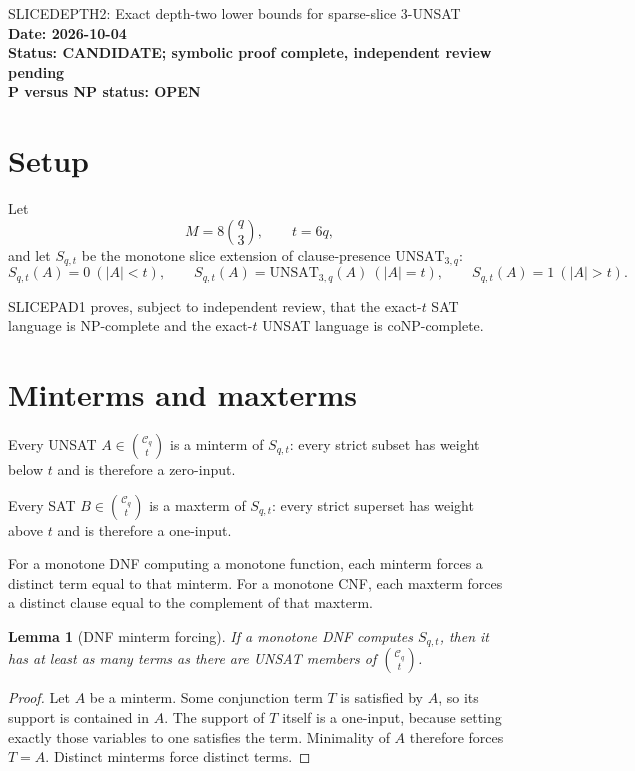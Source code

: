 \documentclass[11pt]{article}
\newtheorem{lemma}{Lemma}
\begin{document}
\begin{center}
{\Large SLICEDEPTH2: Exact depth-two lower bounds for sparse-slice 3-UNSAT}\\[4pt]
\textbf{Date: 2026-10-04}\\
\textbf{Status: CANDIDATE; symbolic proof complete, independent review pending}\\
\textbf{P versus NP status: OPEN}
\end{center}

\section{Setup}

Let
\[
M=8\binom q3,\qquad t=6q,
\]
and let \(S_{q,t}\) be the monotone slice extension of clause-presence
\(\mathrm{UNSAT}_{3,q}\):
\[
S_{q,t}(A)=0\ (|A|<t),\qquad
S_{q,t}(A)=\mathrm{UNSAT}_{3,q}(A)\ (|A|=t),\qquad
S_{q,t}(A)=1\ (|A|>t).
\]

SLICEPAD1 proves, subject to independent review, that the exact-\(t\) SAT
language is NP-complete and the exact-\(t\) UNSAT language is coNP-complete.

\section{Minterms and maxterms}

Every UNSAT \(A\in\binom{\mathcal C_q}{t}\) is a minterm of \(S_{q,t}\):
every strict subset has weight below \(t\) and is therefore a zero-input.

Every SAT \(B\in\binom{\mathcal C_q}{t}\) is a maxterm of \(S_{q,t}\):
every strict superset has weight above \(t\) and is therefore a one-input.

For a monotone DNF computing a monotone function, each minterm forces a
distinct term equal to that minterm.  For a monotone CNF, each maxterm forces
a distinct clause equal to the complement of that maxterm.

\begin{lemma}[DNF minterm forcing]
If a monotone DNF computes \(S_{q,t}\), then it has at least as many terms as
there are UNSAT members of \(\binom{\mathcal C_q}{t}\).
\end{lemma}

\begin{proof}
Let \(A\) be a minterm.  Some conjunction term \(T\) is satisfied by \(A\),
so its support is contained in \(A\).  The support of \(T\) itself is a
one-input, because setting exactly those variables to one satisfies the term.
Minimality of \(A\) therefore forces \(T=A\).  Distinct minterms force
distinct terms.
\end{proof}
\end{document}
